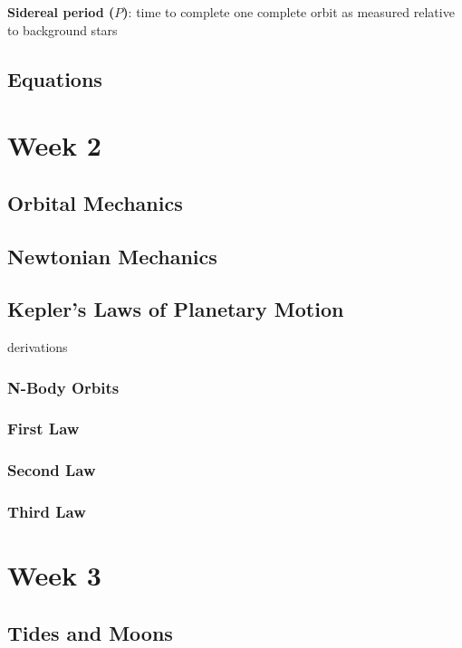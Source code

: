 \documentclass[a4paper,10pt]{article}
\begin{document}
\textbf{Sidereal period ($P$)}: time to complete one complete orbit as measured relative to background stars

\subsection{Equations}



\newpage
\section{Week 2}

\subsection{Orbital Mechanics}

\subsection{Newtonian Mechanics}

\subsection{Kepler's Laws of Planetary Motion}
derivations
\subsubsection{N-Body Orbits}
\subsubsection{First Law}
\subsubsection{Second Law}
\subsubsection{Third Law}


\newpage
\section{Week 3}

\subsection{Tides and Moons}
\end{document}
